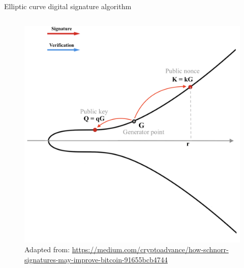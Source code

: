 \documentclass[slidescentered]{beamer}
\newcommand{\source}[1]{\caption*{\tiny Adapted from: {#1}} }
\begin{document}
\begin{frame}{Elliptic curve digital signature algorithm}
\begin{columns}
\begin{column}{0.5\linewidth}
\begin{figure}
{				\source{\tiny \url{https://medium.com/cryptoadvance/how-schnorr-signatures-may-improve-bitcoin-91655bcb4744}}}
				 {\vspace*{-0.5cm}
					\hspace*{-1cm}
					\includegraphics[scale=0.29]{images/ECDSA4}
				\source{\tiny \url{https://medium.com/cryptoadvance/how-schnorr-signatures-may-improve-bitcoin-91655bcb4744}}}
				\end{figure}
			\end{column}
		\end{columns}
	\end{frame}
\end{document}
